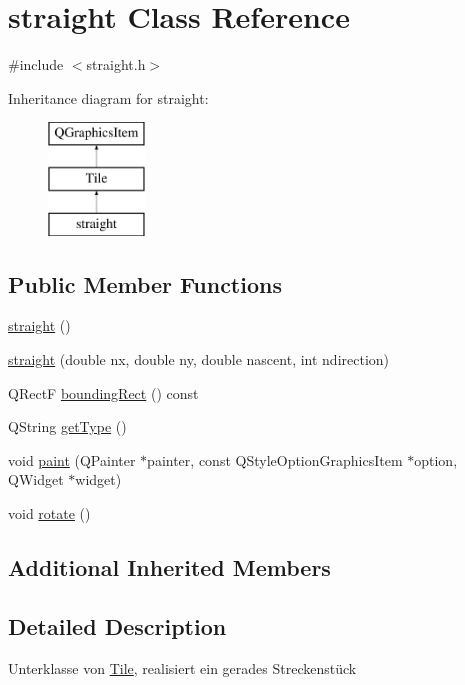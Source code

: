 \hypertarget{classstraight}{}\section{straight Class Reference}
\label{classstraight}


{\ttfamily \#include $<$straight.\+h$>$}

Inheritance diagram for straight\+:\begin{figure}[H]
\begin{center}
\leavevmode
\includegraphics[height=3.000000cm]{classstraight}
\end{center}
\end{figure}
\subsection*{Public Member Functions}
\begin{DoxyCompactItemize}
\item 
\mbox{\hyperlink{classstraight_a0a1895927f40f1cc41debad219730cbe}{straight}} ()
\item 
\mbox{\hyperlink{classstraight_ac580066126df442eba57e77a00991659}{straight}} (double nx, double ny, double nascent, int ndirection)
\item 
Q\+RectF \mbox{\hyperlink{classstraight_a05add152ed81564fa3389b0a6f11cbc2}{bounding\+Rect}} () const
\item 
Q\+String \mbox{\hyperlink{classstraight_a50f5861f414dc03aa4e8947945abcd9e}{get\+Type}} ()
\item 
void \mbox{\hyperlink{classstraight_a324505038865a61ebe65542e29e7575a}{paint}} (Q\+Painter $\ast$painter, const Q\+Style\+Option\+Graphics\+Item $\ast$option, Q\+Widget $\ast$widget)
\item 
void \mbox{\hyperlink{classstraight_a2d60ee00c79e1c10f1bde4a46ea26bdb}{rotate}} ()
\end{DoxyCompactItemize}
\subsection*{Additional Inherited Members}


\subsection{Detailed Description}
Unterklasse von \mbox{\hyperlink{class_tile}{Tile}}, realisiert ein gerades Streckenstück 

